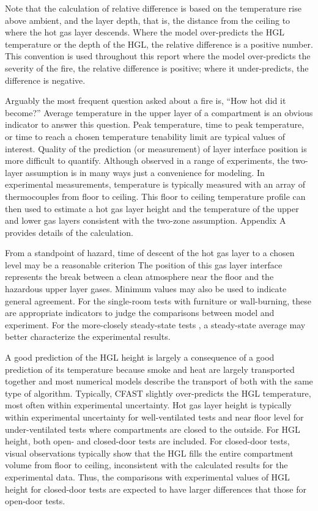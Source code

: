 Note that the calculation of relative difference is based on the temperature rise above ambient, and the layer depth, that is, the distance from the ceiling to where the hot gas layer descends.  Where the model over-predicts the HGL temperature or the depth of the HGL, the relative difference is a positive number. This convention is used throughout this report where the model over-predicts the severity of the fire, the relative difference is positive; where it under-predicts, the difference is negative.

Arguably the most frequent question asked about a fire is, ``How hot did it become?''  Average temperature in the upper layer of a compartment is an obvious indicator to answer this question.  Peak temperature, time to peak temperature, or time to reach a chosen temperature tenability limit are typical values of interest.  Quality of the prediction (or measurement) of layer interface position is more difficult to quantify.  Although observed in a range of experiments, the two-layer assumption is in many ways just a convenience for modeling.  In experimental measurements, temperature is typically measured with an array of thermocouples from floor to ceiling.  This floor to ceiling temperature profile can then used to estimate a hot gas layer height and the temperature of the upper and lower gas layers \cite{Janssens:1992} \cite{McGrattan:2003} consistent with the two-zone assumption. Appendix A provides details of the calculation.

From a standpoint of hazard, time of descent of the hot gas layer to a chosen level may be a reasonable criterion The position of this gas layer interface represents the break between a clean atmosphere near the floor and the hazardous upper layer gases.  Minimum values may also be used to indicate general agreement.  For the single-room tests with furniture or wall-burning, these are appropriate indicators to judge the comparisons between model and experiment.  For the more-closely steady-state tests , a steady-state average may better characterize the experimental results.

A good prediction of the HGL height is largely a consequence of a good prediction of its temperature because smoke and heat are largely transported together and most numerical models describe the transport of both with the same type of algorithm.  Typically, CFAST slightly over-predicts the HGL temperature, most often within experimental uncertainty.  Hot gas layer height is typically within experimental uncertainty for well-ventilated tests and near floor level for under-ventilated tests where compartments are closed to the outside.  For HGL height, both open- and closed-door tests are included.  For closed-door tests, visual observations typically show that the HGL fills the entire compartment volume from floor to ceiling, inconsistent with the calculated results for the experimental data.  Thus, the comparisons with experimental values of HGL height for closed-door tests are expected to have larger differences that those for open-door tests.

